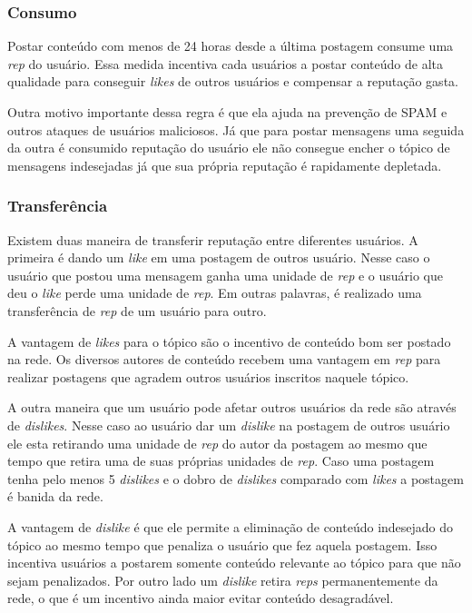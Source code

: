 \documentclass[12pt]{article}
\begin{document}
\subsubsection{Consumo} \label{subsubsec:consumo}

Postar conteúdo com menos de 24 horas desde a última postagem consume uma \emph{rep} do usuário. Essa medida incentiva cada usuários a postar conteúdo de alta qualidade para conseguir \emph{likes} de outros usuários e compensar a reputação gasta.

Outra motivo importante dessa regra é que ela ajuda na prevenção de SPAM e outros ataques de usuários maliciosos. Já que para postar mensagens uma seguida da outra é consumido reputação do usuário ele não consegue encher o tópico de mensagens indesejadas já que sua própria reputação é rapidamente depletada. 

\subsubsection{Transferência} \label{subsubsec:transfe}

Existem duas maneira de transferir reputação entre diferentes usuários. A primeira é dando um \emph{like} em uma postagem de outros usuário. Nesse caso o usuário que postou uma mensagem ganha uma unidade de \emph{rep} e o usuário que deu o \emph{like} perde uma unidade de \emph{rep}. Em outras palavras, é realizado uma transferência de \emph{rep} de um usuário para outro. 

A vantagem de \emph{likes} para o tópico são o incentivo de conteúdo  bom ser postado na rede. Os diversos autores de conteúdo recebem uma vantagem em \emph{rep} para realizar postagens que agradem outros usuários inscritos naquele tópico.

A outra maneira que um usuário pode afetar outros usuários da rede são através de \emph{dislikes}. Nesse caso ao usuário dar um \emph{dislike} na postagem de outros usuário ele esta retirando uma unidade de \emph{rep} do autor da postagem ao mesmo que tempo que retira uma de suas próprias unidades de \emph{rep}. Caso uma postagem tenha pelo menos 5 \emph{dislikes} e o dobro de \emph{dislikes} comparado com \emph{likes} a postagem é banida da rede.  

A vantagem de \emph{dislike} é que ele permite a eliminação de conteúdo indesejado do tópico ao mesmo tempo que penaliza o usuário que fez aquela postagem. Isso incentiva usuários a postarem somente conteúdo relevante ao tópico para que não sejam penalizados. Por outro lado um \emph{dislike} retira \emph{reps} permanentemente da rede, o que é um incentivo ainda maior evitar conteúdo desagradável.
\end{document}
